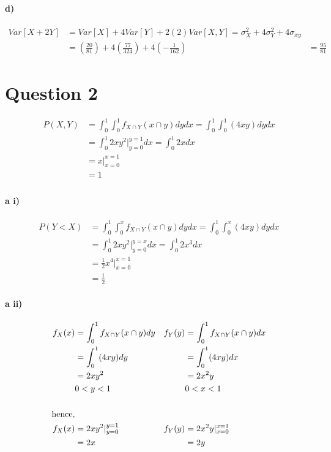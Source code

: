 \documentclass[letterpaper,12pt,titlepage,oneside,final]{book}
\begin{document}
\paragraph{d)}
\begin{align*}
Var[X + 2Y] &= Var[X] + 4Var[Y] +2(2)Var[X,Y]= \sigma_X^2 +4\sigma_Y^2 +4\sigma_{xy}\\
& =  \left(\frac{20}{81}\right) +4\left(\frac{77}{324}\right) + 4\left(-\frac{1}{162}\right)
&= \frac{95}{81}
\end{align*}
\clearpage



\section*{Question 2}
\begin{align*}
P(X,Y) &= \int_0^1 \int_{0}^{1}f_{X \cap Y}(x\cap y)dydx = \int_0^1 \int_{0}^{1}(4xy)dydx\\
&= \int_0^1 2xy^2\rvert_{y=0}^{y=1}dx = \int_0^1 2xdx\\
&= x\rvert_{x=0}^{x=1}\\ &=1\\
\end{align*}
\paragraph{a i)}
\begin{align*}
P(Y<X) &= \int_0^1 \int_{0}^{x}f_{X \cap Y}(x\cap y)dydx = \int_0^1 \int_{0}^{x}(4xy) dydx\\
&= \int_0^1 2xy^2\rvert_{y=0}^{y=x}dx = \int_0^1 2x^3dx\\
&= \frac{1}{2}x^4\rvert_{x=0}^{x=1}\\
&= \frac{1}{2}
\end{align*}
\paragraph{a ii)}
\begin{align*}
f_X(x)&=\int_{0}^{1}f_{X \cap Y}(x\cap y)dy &f_Y(y)&=\int_{0}^{1}f_{X \cap Y}(x\cap y)dx\\
&=\int_{0}^{1}(4xy)dy &&=\int_{0}^{1}(4xy)dx\\
&= 2xy^2 &&= 2x^2y\\
& 0<y<1 && 0<x<1\\
\bigskip\\
\text{hence},\\
f_X(x)&= 2xy^2 \rvert_{y=0}^{y=1} &f_Y(y)&= 2x^2y\rvert_{x=0}^{x=1}\\
&=2x &&=2y
\end{align*}
\end{document}
